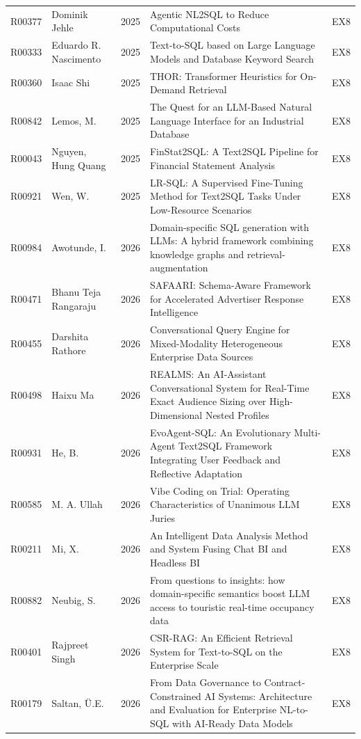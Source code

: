 {\begin{longtable}{@{}l p{3.0cm} l p{11.2cm} l@{}}
R00377 & Dominik Jehle & 2025 & Agentic NL2SQL to Reduce Computational Costs & EX8 \\
R00333 & Eduardo R. Nascimento & 2025 & Text-to-SQL based on Large Language Models and Database Keyword Search & EX8 \\
R00360 & Isaac Shi & 2025 & THOR: Transformer Heuristics for On-Demand Retrieval & EX8 \\
R00842 & Lemos, M. & 2025 & The Quest for an LLM-Based Natural Language Interface for an Industrial Database & EX8 \\
R00043 & Nguyen, Hung Quang & 2025 & FinStat2SQL: A Text2SQL Pipeline for Financial Statement Analysis & EX8 \\
R00921 & Wen, W. & 2025 & LR-SQL: A Supervised Fine-Tuning Method for Text2SQL Tasks Under Low-Resource Scenarios & EX8 \\
R00984 & Awotunde, I. & 2026 & Domain-specific SQL generation with LLMs: A hybrid framework combining knowledge graphs and retrieval-augmentation & EX8 \\
R00471 & Bhanu Teja Rangaraju & 2026 & SAFAARI: Schema-Aware Framework for Accelerated Advertiser Response Intelligence & EX8 \\
R00455 & Darshita Rathore & 2026 & Conversational Query Engine for Mixed-Modality Heterogeneous Enterprise Data Sources & EX8 \\
R00498 & Haixu Ma & 2026 & REALMS: An AI-Assistant Conversational System for Real-Time Exact Audience Sizing over High-Dimensional Nested Profiles & EX8 \\
R00931 & He, B. & 2026 & EvoAgent-SQL: An Evolutionary Multi-Agent Text2SQL Framework Integrating User Feedback and Reflective Adaptation & EX8 \\
R00585 & M. A. Ullah & 2026 & Vibe Coding on Trial: Operating Characteristics of Unanimous LLM Juries & EX8 \\
R00211 & Mi, X. & 2026 & An Intelligent Data Analysis Method and System Fusing Chat BI and Headless BI & EX8 \\
R00882 & Neubig, S. & 2026 & From questions to insights: how domain-specific semantics boost LLM access to touristic real-time occupancy data & EX8 \\
R00401 & Rajpreet Singh & 2026 & CSR-RAG: An Efficient Retrieval System for Text-to-SQL on the Enterprise Scale & EX8 \\
R00179 & Saltan, Ü.E. & 2026 & From Data Governance to Contract-Constrained AI Systems: Architecture and Evaluation for Enterprise NL-to-SQL with AI-Ready Data Models & EX8 \\

\end{longtable}}
